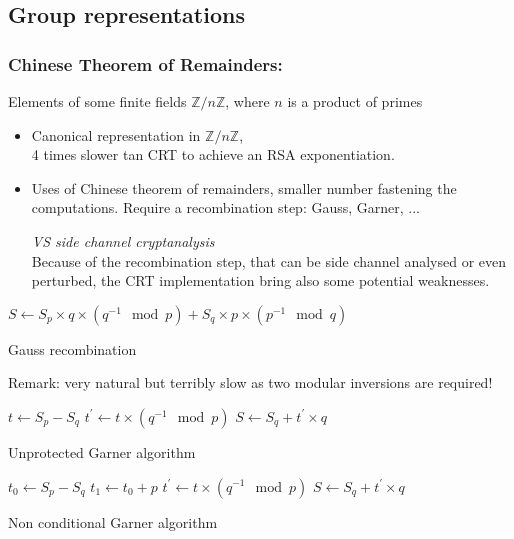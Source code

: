 		


\subsection{Group representations}

\subsubsection{Chinese Theorem of Remainders:}
Elements of some finite fields $ \mathbb{Z}/{n \mathbb{Z}} $, 
where $n$ is a product of primes
\begin{itemize}
	\item Canonical representation in $ \mathbb{Z}/{n \mathbb{Z}} $,\\
	4 times slower tan CRT to achieve an RSA exponentiation.	
	
	\item Uses of Chinese theorem of remainders, 
	smaller number fastening the computations.
	Require a recombination step: Gauss, Garner, ...

	\noindent
	\textit{VS side channel cryptanalysis}\\
Because of the recombination step, that can be side channel analysed or even
perturbed, the CRT implementation bring also some potential weaknesses.
\end{itemize}

			\begin{algorithm}[h]
				$S \leftarrow 
				S_p \times q \times (q^{-1} \mod p) +
				S_q \times p \times (p^{-1} \mod q) $\;	
				\caption{Gauss recombination}
			\end{algorithm}
			Remark: very natural but terribly slow as two modular inversions are required!
			\begin{algorithm}[h]
				$t \leftarrow S_p-S_q$\;
				$t^{'} \leftarrow t \times (q^{-1} \mod p)$	\;
				$S \leftarrow S_q + t^{'} \times q$\;	
				\caption{Unprotected Garner algorithm}
			\end{algorithm}
			
			\begin{algorithm}[h]
				$t_0 \leftarrow S_p- S_q$\;
				$t_1 \leftarrow t_0 +p$\;
				$t^{'} \leftarrow t \times (q^{-1} \mod p)$	\;
				$S \leftarrow S_q + t^{'} \times q$\;		
				\caption{Non conditional Garner algorithm}
			\end{algorithm}	
			

